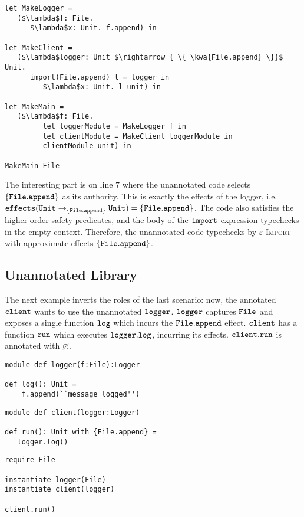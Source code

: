 \begin{lstlisting}
let MakeLogger =
   ($\lambda$f: File.
      $\lambda$x: Unit. f.append) in
          
let MakeClient =
   ($\lambda$logger: Unit $\rightarrow_{ \{ \kwa{File.append} \}}$ Unit.
      import(File.append) l = logger in
         $\lambda$x: Unit. l unit) in
          
let MakeMain =
   ($\lambda$f: File.
         let loggerModule = MakeLogger f in
         let clientModule = MakeClient loggerModule in
         clientModule unit) in

MakeMain File
\end{lstlisting}

The interesting part  is on line $7$ where the unannotated code selects $\{ \mathtt{File.append} \}$ as its authority. This is exactly the effects of the logger, i.e. $\mathtt{effects}(\mathtt{Unit} \rightarrow_{\{\mathtt{File.append}\}} \mathtt{Unit}) = \{ \mathtt{File.append} \}$. The code also satisfies the higher-order safety predicates, and the body of the $\mathtt{import}$ expression typechecks in the empty context. Therefore, the unannotated code typechecks by \textsc{$\varepsilon$-Import} with approximate effects $\mathtt{\{ \mathtt{File.append} \}}$.


\subsection{Unannotated Library}

The next example inverts the roles of the last scenario: now, the annotated $\mathtt{client}$ wants to use the unannotated $\mathtt{logger}$. $\mathtt{logger}$ captures $\mathtt{File}$ and exposes a single function $\mathtt{log}$ which incurs the $\mathtt{File.append}$ effect. $\mathtt{client}$ has a function $\mathtt{run}$ which executes $\mathtt{logger.log}$, incurring its effects. $\mathtt{client.run}$ is annotated with $\varnothing$.

\begin{lstlisting}
module def logger(f:File):Logger

def log(): Unit =
    f.append(``message logged'')
\end{lstlisting}

\begin{lstlisting}
module def client(logger:Logger)

def run(): Unit with {File.append} =
   logger.log()
\end{lstlisting}

\begin{lstlisting}
require File

instantiate logger(File)
instantiate client(logger)

client.run()
\end{lstlisting}

